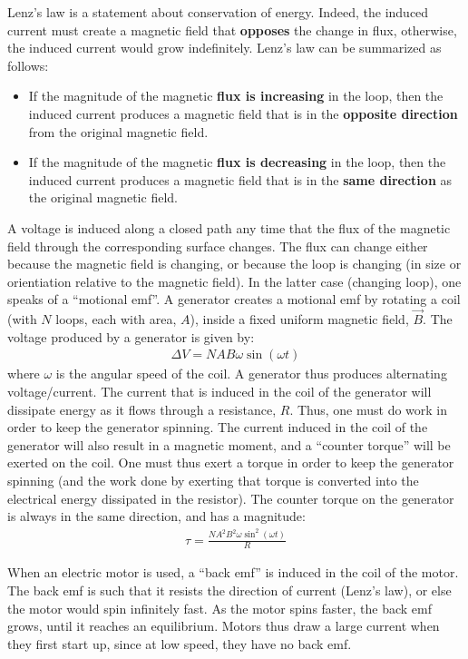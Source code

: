 \begin{chapterSummary}
Lenz's law is a statement about conservation of energy. Indeed, the induced current must create a magnetic field that \textbf{opposes} the change in flux, otherwise, the induced current would grow indefinitely. Lenz's law can be summarized as follows:
\begin{itemize}
\item If the magnitude of the magnetic \textbf{flux is increasing} in the loop, then the induced current produces a magnetic field that is in the \textbf{opposite direction} from the original magnetic field.
\item If the magnitude of the magnetic \textbf{flux is decreasing} in the loop, then the induced current produces a magnetic field that is in the \textbf{same direction} as the original magnetic field.
\end{itemize}

A voltage is induced along a closed path any time that the flux of the magnetic field through the corresponding surface changes. The flux can change either because the magnetic field is changing, or because the loop is changing (in size or orientiation relative to the magnetic field). In the latter case (changing loop), one speaks of a ``motional emf''. A generator creates a motional emf by rotating a coil (with $N$ loops, each with area, $A$), inside a fixed uniform magnetic field, $\vec B$. The voltage produced by a generator is given by:
\begin{align*}
\Delta V = NAB\omega\sin(\omega t)
\end{align*}
where $\omega$ is the angular speed of the coil. A generator thus produces alternating voltage/current. The current that is induced in the coil of the generator will dissipate energy as it flows through a resistance, $R$. Thus, one must do work in order to keep the generator spinning. The current induced in the coil of the generator will also result in a magnetic moment, and a ``counter torque'' will be exerted on the coil. One must thus exert a torque in order to keep the generator spinning (and the work done by exerting that torque is converted into the electrical energy dissipated in the resistor). The counter torque on the generator is always in the same direction, and has a magnitude:
\begin{align*}
\tau = \frac{NA^2B^2\omega\sin^2(\omega t)}{R}
\end{align*}

When an electric motor is used, a ``back emf'' is induced in the coil of the motor. The back emf is such that it resists the direction of current (Lenz's law), or else the motor would spin infinitely fast. As the motor spins faster, the back emf grows, until it reaches an equilibrium. Motors thus draw a large current when they first start up, since at low speed, they have no back emf. 


\end{chapterSummary}
